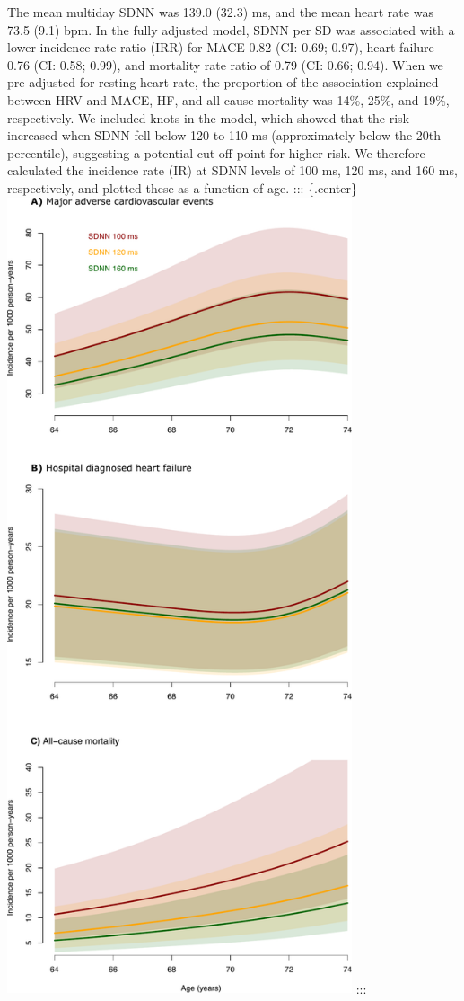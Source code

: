 \documentclass[
  a4paper,
  headsepline=true,
  open=any]{scrbook}
\begin{document}
The mean multiday SDNN was 139.0 (32.3) ms, and the mean heart rate was
73.5 (9.1) bpm. In the fully adjusted model, SDNN per SD was associated
with a lower incidence rate ratio (IRR) for MACE 0.82 (CI: 0.69; 0.97),
heart failure 0.76 (CI: 0.58; 0.99), and mortality rate ratio of 0.79
(CI: 0.66; 0.94). When we pre-adjusted for resting heart rate, the
proportion of the association explained between HRV and MACE, HF, and
all-cause mortality was 14\%, 25\%, and 19\%, respectively. We included
knots in the model, which showed that the risk increased when SDNN fell
below 120 to 110 ms (approximately below the 20th percentile),
suggesting a potential cut-off point for higher risk. We therefore
calculated the incidence rate (IR) at SDNN levels of 100 ms, 120 ms, and
160 ms, respectively, and plotted these as a function of age. :::
\{.center\}
\includegraphics[width=4in,height=\textheight]{images/addition_pro_hrv_ir_mace.pdf}
:::
\end{document}
